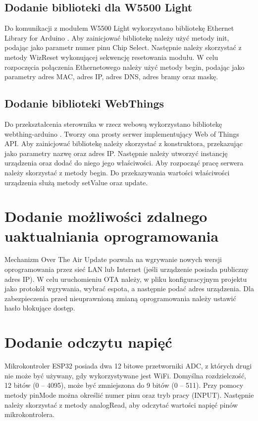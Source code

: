 \documentclass[11pt]{report}
\begin{document}
 \subsection{Dodanie biblioteki dla W5500 Light}
 Do komunikacji z modułem W5500 Light wykorzystano bibliotekę Ethernet Library for Arduino \cite{ethernetlibrary}. Aby zainicjować bibliotekę należy użyć metody init, podając jako parametr numer pinu Chip Select. Następnie należy skorzystać z metody WizReset wykonującej sekwencję resetowania modułu. W celu rozpoczęcia połączenia Ethernetowego należy użyć metody begin, podając jako parametry adres MAC, adres IP, adres DNS, adres bramy oraz maskę.
 \subsection{Dodanie biblioteki WebThings}
 Do przekształcenia sterownika w rzecz webową wykorzystano bibliotekę webthing-arduino \cite{webthinglibrary}. Tworzy ona prosty serwer implementujący Web of Things API.
 Aby zainicjować bibliotekę należy skorzystać z konstruktora, przekazując jako parametry nazwę oraz adres IP. Następnie należy utworzyć instancję urządzenia oraz dodać do niego jego właściwości. Aby rozpocząć pracę serwera należy skorzystać z metody begin. Do przekazywania wartości właściwości urządzenia służą metody setValue oraz update.
 
 \section{Dodanie możliwości zdalnego uaktualniania oprogramowania}
 Mechanizm Over The Air Update pozwala na wgrywanie nowych wersji oprogramowania przez sieć LAN lub Internet (jeśli urządzenie posiada publiczny adres IP). W celu uruchomieniu OTA należy, w pliku konfiguracyjnym projektu jako protokół wgrywania, wybrać espota, a następnie podać adres urządzenia. Dla zabezpieczenia przed nieuprawnioną zmianą oprogramowania należy ustawić hasło blokujące dostęp.
 
 \section{Dodanie odczytu napięć}
 Mikrokontroler ESP32 posiada dwa 12 bitowe przetworniki ADC, z których drugi nie może być używany, gdy wykorzystywane jest WiFi. Domyślna rozdzielczość, 12 bitów (0 – 4095), może być zmniejszona do 9 bitów (0 – 511).
 Przy pomocy metody pinMode można określić numer pinu oraz tryb pracy (INPUT). Następnie należy skorzystać z metody analogRead, aby odczytać wartości napięć pinów mikrokontrolera.
 
\end{document}
